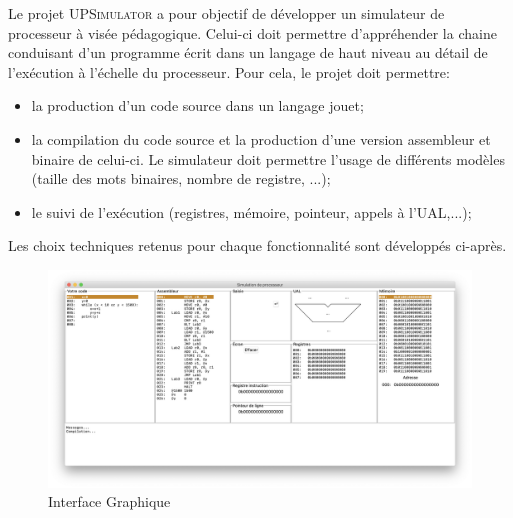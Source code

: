 Le projet \textsc{UPSimulator} a pour objectif de développer un simulateur de processeur à visée pédagogique. Celui-ci doit permettre d'appréhender la chaine conduisant d'un programme écrit dans un langage de haut niveau au détail de l'exécution à l'échelle du processeur. Pour cela, le projet doit permettre:
\begin{itemize}
	\item la production d'un code source dans un langage jouet;
	\item la compilation du code source et la production d'une version assembleur et binaire de celui-ci. Le simulateur doit permettre l'usage de différents modèles (taille des mots binaires, nombre de registre, ...);
	\item le suivi de l'exécution (registres, mémoire, pointeur, appels à l'UAL,...);
\end{itemize}

Les choix techniques retenus pour chaque fonctionnalité sont développés ci-après.

\begin{figure}[h!]
	\includegraphics[width=\textwidth]{./Pictures/Header.png}
	\caption{\label{fig:gui} Interface Graphique}
\end{figure}